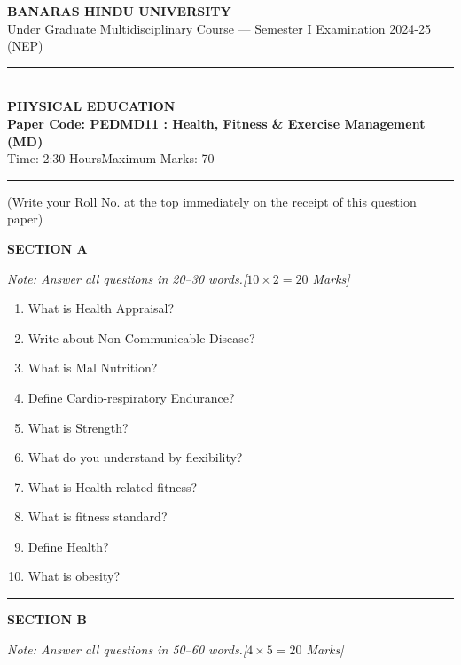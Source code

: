 \documentclass[11pt,a4paper]{article}
\begin{document}
\begin{center}
  {\large\bfseries BANARAS HINDU UNIVERSITY}\\[2pt]
  {\normalsize Under Graduate Multidisciplinary Course --- Semester I Examination 2024-25 (NEP)}\\[6pt]
  \rule{0.8\linewidth}{0.5pt}\\[6pt]
  {\large\bfseries PHYSICAL EDUCATION}\\[4pt]
  {\large\bfseries Paper Code: PEDMD11 : Health, Fitness \& Exercise Management (MD)}\\[4pt]
  {\normalsize Time: 2:30 Hours\hfill Maximum Marks: 70}
\end{center}

\rule{\linewidth}{0.4pt}

\smallskip



\noindent (Write your Roll No. at the top immediately on the receipt of this question paper)

\bigskip

\centerline{   \textbf{SECTION A}}
\smallskip



\noindent   \textit{Note: Answer all questions in 20--30 words.\hfill [$10  \times 2 = 20$ Marks]}


\begin{enumerate}[label=   \textbf{\arabic*.}]
    \item What is Health Appraisal?
    \item Write about Non-Communicable Disease?
    \item What is Mal Nutrition?
    \item Define Cardio-respiratory Endurance?
    \item What is Strength?
    \item What do you understand by flexibility?
    \item What is Health related fitness?
    \item What is fitness standard?
    \item Define Health?
    \item What is obesity?
\end{enumerate}

\bigskip
\rule{\linewidth}{0.2pt}
\medskip

\centerline{   \textbf{SECTION B}}
\smallskip



\noindent   \textit{Note: Answer all questions in 50--60 words.\hfill [$4  \times 5 = 20$ Marks]}
\end{document}
